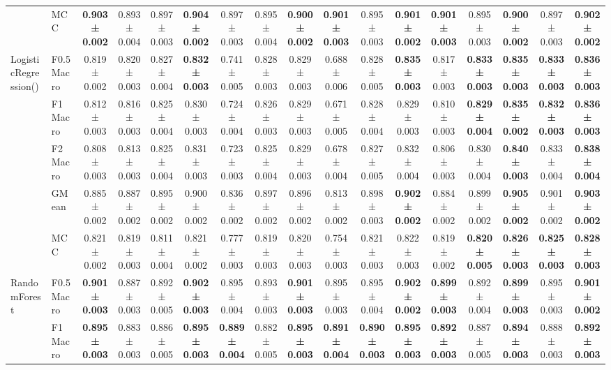 \begin{table}[H]
{\begin{tabular}{llccccccccccccccc}
 & MCC & \textbf{0.903 ± 0.002} & 0.893 ± 0.004 & 0.897 ± 0.003 & \textbf{0.904 ± 0.002} & 0.897 ± 0.003 & 0.895 ± 0.004 & \textbf{0.900 ± 0.002} & \textbf{0.901 ± 0.003} & 0.895 ± 0.003 & \textbf{0.901 ± 0.002} & \textbf{0.901 ± 0.003} & 0.895 ± 0.003 & \textbf{0.900 ± 0.002} & 0.897 ± 0.003 & \textbf{0.902 ± 0.002} \\
\cline{1-17}
\multirow[t]{5}{*}{LogisticRegression()} & F0.5 Macro & 0.819 ± 0.002 & 0.820 ± 0.003 & 0.827 ± 0.004 & \textbf{0.832 ± 0.003} & 0.741 ± 0.005 & 0.828 ± 0.003 & 0.829 ± 0.003 & 0.688 ± 0.006 & 0.828 ± 0.005 & \textbf{0.835 ± 0.003} & 0.817 ± 0.003 & \textbf{0.833 ± 0.003} & \textbf{0.835 ± 0.003} & \textbf{0.833 ± 0.003} & \textbf{0.836 ± 0.003} \\
 & F1 Macro & 0.812 ± 0.003 & 0.816 ± 0.003 & 0.825 ± 0.004 & 0.830 ± 0.003 & 0.724 ± 0.004 & 0.826 ± 0.003 & 0.829 ± 0.003 & 0.671 ± 0.005 & 0.828 ± 0.004 & 0.829 ± 0.003 & 0.810 ± 0.003 & \textbf{0.829 ± 0.004} & \textbf{0.835 ± 0.002} & \textbf{0.832 ± 0.003} & \textbf{0.836 ± 0.003} \\
 & F2 Macro & 0.808 ± 0.003 & 0.813 ± 0.003 & 0.825 ± 0.004 & 0.831 ± 0.003 & 0.723 ± 0.003 & 0.825 ± 0.004 & 0.829 ± 0.003 & 0.678 ± 0.004 & 0.827 ± 0.005 & 0.832 ± 0.004 & 0.806 ± 0.003 & 0.830 ± 0.004 & \textbf{0.840 ± 0.003} & 0.833 ± 0.004 & \textbf{0.838 ± 0.004} \\
 & GMean & 0.885 ± 0.002 & 0.887 ± 0.002 & 0.895 ± 0.002 & 0.900 ± 0.002 & 0.836 ± 0.002 & 0.897 ± 0.002 & 0.896 ± 0.002 & 0.813 ± 0.002 & 0.898 ± 0.003 & \textbf{0.902 ± 0.002} & 0.884 ± 0.002 & 0.899 ± 0.002 & \textbf{0.905 ± 0.002} & 0.901 ± 0.002 & \textbf{0.903 ± 0.002} \\
 & MCC & 0.821 ± 0.002 & 0.819 ± 0.003 & 0.811 ± 0.004 & 0.821 ± 0.002 & 0.777 ± 0.003 & 0.819 ± 0.003 & 0.820 ± 0.003 & 0.754 ± 0.003 & 0.821 ± 0.003 & 0.822 ± 0.003 & 0.819 ± 0.002 & \textbf{0.820 ± 0.005} & \textbf{0.826 ± 0.003} & \textbf{0.825 ± 0.003} & \textbf{0.828 ± 0.003} \\
\cline{1-17}
\multirow[t]{5}{*}{RandomForest} & F0.5 Macro & \textbf{0.901 ± 0.003} & 0.887 ± 0.003 & 0.892 ± 0.005 & \textbf{0.902 ± 0.003} & 0.895 ± 0.004 & 0.893 ± 0.003 & \textbf{0.901 ± 0.003} & 0.895 ± 0.003 & 0.895 ± 0.004 & \textbf{0.902 ± 0.002} & \textbf{0.899 ± 0.003} & 0.892 ± 0.004 & \textbf{0.899 ± 0.003} & 0.895 ± 0.003 & \textbf{0.901 ± 0.002} \\
 & F1 Macro & \textbf{0.895 ± 0.003} & 0.883 ± 0.003 & 0.886 ± 0.005 & \textbf{0.895 ± 0.003} & \textbf{0.889 ± 0.004} & 0.882 ± 0.005 & \textbf{0.895 ± 0.003} & \textbf{0.891 ± 0.004} & \textbf{0.890 ± 0.003} & \textbf{0.895 ± 0.003} & \textbf{0.892 ± 0.003} & 0.887 ± 0.005 & \textbf{0.894 ± 0.003} & 0.888 ± 0.003 & \textbf{0.892 ± 0.003} \\

\end{tabular}}
\end{table}
